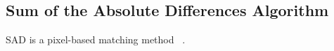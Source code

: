 \subsection{Sum of the Absolute Differences Algorithm}

SAD is a pixel-based matching method ~\cite{alteraStratixIVPaper}. 





















